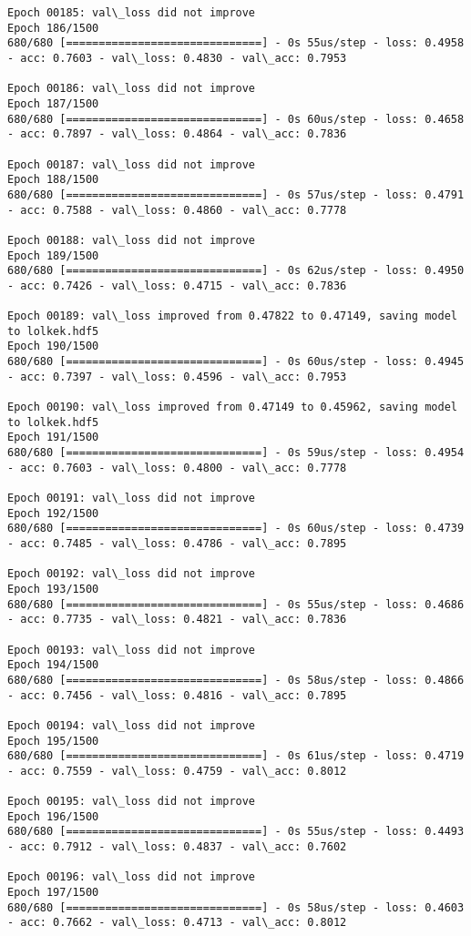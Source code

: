 \documentclass[11pt]{article}
\begin{document}
\begin{Verbatim}[commandchars=\\\{\}]
Epoch 00185: val\_loss did not improve
Epoch 186/1500
680/680 [==============================] - 0s 55us/step - loss: 0.4958 - acc: 0.7603 - val\_loss: 0.4830 - val\_acc: 0.7953

Epoch 00186: val\_loss did not improve
Epoch 187/1500
680/680 [==============================] - 0s 60us/step - loss: 0.4658 - acc: 0.7897 - val\_loss: 0.4864 - val\_acc: 0.7836

Epoch 00187: val\_loss did not improve
Epoch 188/1500
680/680 [==============================] - 0s 57us/step - loss: 0.4791 - acc: 0.7588 - val\_loss: 0.4860 - val\_acc: 0.7778

Epoch 00188: val\_loss did not improve
Epoch 189/1500
680/680 [==============================] - 0s 62us/step - loss: 0.4950 - acc: 0.7426 - val\_loss: 0.4715 - val\_acc: 0.7836

Epoch 00189: val\_loss improved from 0.47822 to 0.47149, saving model to lolkek.hdf5
Epoch 190/1500
680/680 [==============================] - 0s 60us/step - loss: 0.4945 - acc: 0.7397 - val\_loss: 0.4596 - val\_acc: 0.7953

Epoch 00190: val\_loss improved from 0.47149 to 0.45962, saving model to lolkek.hdf5
Epoch 191/1500
680/680 [==============================] - 0s 59us/step - loss: 0.4954 - acc: 0.7603 - val\_loss: 0.4800 - val\_acc: 0.7778

Epoch 00191: val\_loss did not improve
Epoch 192/1500
680/680 [==============================] - 0s 60us/step - loss: 0.4739 - acc: 0.7485 - val\_loss: 0.4786 - val\_acc: 0.7895

Epoch 00192: val\_loss did not improve
Epoch 193/1500
680/680 [==============================] - 0s 55us/step - loss: 0.4686 - acc: 0.7735 - val\_loss: 0.4821 - val\_acc: 0.7836

Epoch 00193: val\_loss did not improve
Epoch 194/1500
680/680 [==============================] - 0s 58us/step - loss: 0.4866 - acc: 0.7456 - val\_loss: 0.4816 - val\_acc: 0.7895

Epoch 00194: val\_loss did not improve
Epoch 195/1500
680/680 [==============================] - 0s 61us/step - loss: 0.4719 - acc: 0.7559 - val\_loss: 0.4759 - val\_acc: 0.8012

Epoch 00195: val\_loss did not improve
Epoch 196/1500
680/680 [==============================] - 0s 55us/step - loss: 0.4493 - acc: 0.7912 - val\_loss: 0.4837 - val\_acc: 0.7602

Epoch 00196: val\_loss did not improve
Epoch 197/1500
680/680 [==============================] - 0s 58us/step - loss: 0.4603 - acc: 0.7662 - val\_loss: 0.4713 - val\_acc: 0.8012


\end{Verbatim}
\end{document}
